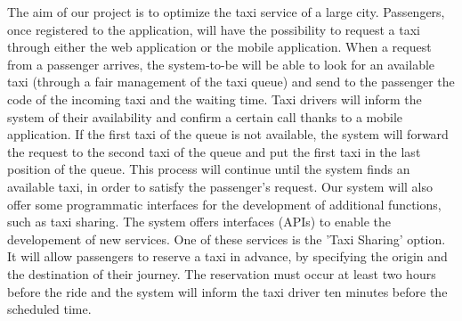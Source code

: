 The aim of our project is to optimize the taxi service of a large city. 
Passengers, once registered to the application, will have the possibility to request a taxi through either the web application or the mobile application. When a request from a passenger arrives, the system-to-be will be able to look for an available taxi (through a fair management of the taxi queue) and send to the passenger the code of the incoming taxi and the waiting time. Taxi drivers will inform the system of their availability and confirm a certain call thanks to a mobile application.
\newline
If the first taxi of the queue is not available, the system will forward the request to the second taxi of the queue and put the first taxi in the last position of the queue. This process will continue until the system finds an available taxi, in order to satisfy the passenger's request.
\newline
Our system will also offer some programmatic interfaces for the development of additional functions, such as taxi sharing.
\newline
The system offers interfaces (APIs) to enable the developement of new services.
\newline
One of these services is the 'Taxi Sharing' option.
It will allow passengers to reserve a taxi in advance, by specifying the origin and the destination of their journey. The reservation must occur at least two hours before the ride and the system will inform the taxi driver ten minutes before the scheduled time.